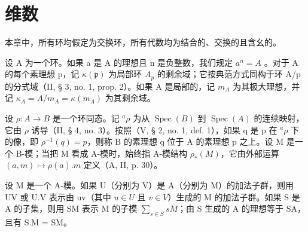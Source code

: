 \chapter{维数}

本章中，所有环均假定为交换环，所有代数均为结合的、交换的且含幺的。

设 A 为一个环。如果 a 是 A 的理想且 n 是负整数，我们规定 \(a^{n} = A\) 。对于 A 的每个素理想 p，记 \(\kappa(\mathfrak{p})\) 为局部环 \(A_{p}\) 的剩余域；它按典范方式同构于环 A/p 的分式域（II, § 3, no. 1, prop. 2）。如果 A 是局部的，记 \(m_{A}\) 为其极大理想，并记 \(\kappa_{A} = A/m_{A} = \kappa(m_{A})\) 为其剩余域。

设 \(\rho: A \to B\) 是一个环同态。记 \(^a\rho\) 为从 \(\operatorname{Spec}(B)\) 到 \(\operatorname{Spec}(A)\) 的连续映射，它由 \(\rho\) 诱导（II, § 4, no. 3）。按照（V, § 2, no. 1, def. 1），如果 q 是 p 在 \(^a\rho\) 下的像，即 \(\rho^{-1}(q) = p\)，则称 B 的素理想 q 位于 A 的素理想 p 之上。设 M 是一个 B-模；当把 M 看成 A-模时，始终指 A-模结构 \(\rho_*(M)\)，它由外部运算 \((a, m) \mapsto \rho(a).m\) 定义（A, II, p. 30）。

设 M 是一个 A-模。如果 U（分别为 V）是 A（分别为 M）的加法子群，则用 UV 或 U.V 表示由 uv（其中 \(u \in U\) 且 \(v \in V\)）生成的 M 的加法子群。如果 S 是 A 的子集，则用 SM 表示 M 的子模 \(\sum_{s \in S} sM\)；由 S 生成的 A 的理想等于 SA，且有 S.M = SM。

